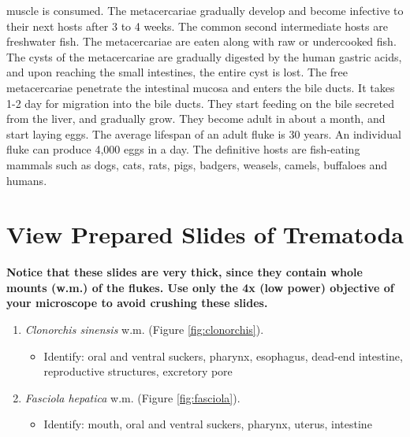 \documentclass[]{book}
\providecommand{\tightlist}{%
  \setlength{\itemsep}{0pt}\setlength{\parskip}{0pt}}
\theoremstyle{definition}
\theoremstyle{definition}
\theoremstyle{definition}
\theoremstyle{remark}
\let\BeginKnitrBlock\begin \let\EndKnitrBlock\end
\begin{document}
muscle is consumed. The metacercariae gradually develop and become
infective to their next hosts after 3 to 4 weeks. The common second
intermediate hosts are freshwater fish. The metacercariae are eaten
along with raw or undercooked fish. The cysts of the metacercariae are
gradually digested by the human gastric acids, and upon reaching the
small intestines, the entire cyst is lost. The free metacercariae
penetrate the intestinal mucosa and enters the bile ducts. It takes 1-2
day for migration into the bile ducts. They start feeding on the bile
secreted from the liver, and gradually grow. They become adult in about
a month, and start laying eggs. The average lifespan of an adult fluke
is 30 years. An individual fluke can produce 4,000 eggs in a day. The
definitive hosts are fish-eating mammals such as dogs, cats, rats, pigs,
badgers, weasels, camels, buffaloes and humans.

\section{View Prepared Slides of
Trematoda}\label{view-prepared-slides-trematoda}

\BeginKnitrBlock{rmdcaution}
\textbf{Notice that these slides are very thick, since they contain
whole mounts (w.m.) of the flukes. Use only the 4x (low power) objective
of your microscope to avoid crushing these slides.}
\EndKnitrBlock{rmdcaution}

\begin{enumerate}
\def\labelenumi{\arabic{enumi}.}
\tightlist
\item
  \emph{Clonorchis sinensis} w.m. (Figure \ref{fig:clonorchis}).

  \begin{itemize}
  \tightlist
  \item
    Identify: oral and ventral suckers, pharynx, esophagus, dead-end
    intestine, reproductive structures, excretory pore
  \end{itemize}
\item
  \emph{Fasciola hepatica} w.m. (Figure \ref{fig:fasciola}).

  \begin{itemize}
  \tightlist
  \item
    Identify: mouth, oral and ventral suckers, pharynx, uterus,
    intestine
  \end{itemize}
\end{enumerate}
\end{document}
